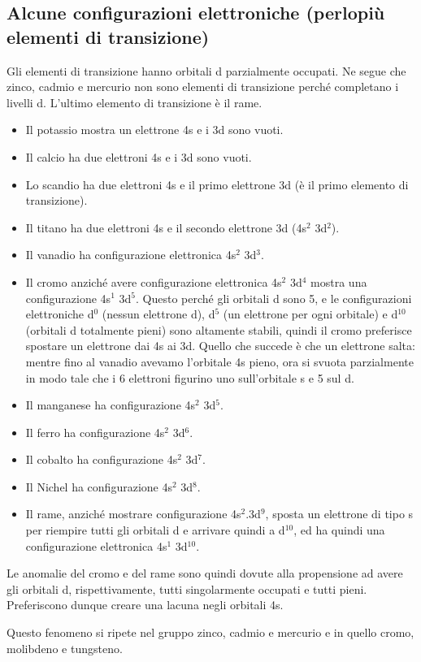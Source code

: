 \subsection{Alcune configurazioni elettroniche (perlopiù elementi di transizione)}
Gli elementi di transizione hanno orbitali d parzialmente occupati. Ne segue che zinco, cadmio e mercurio non sono elementi di transizione perché completano i livelli d. L'ultimo elemento di transizione è il rame.
\begin{itemize}
  \item Il potassio mostra un elettrone 4s e i 3d sono vuoti.
  \item Il calcio ha due elettroni 4s e i 3d sono vuoti.
  \item Lo scandio ha due elettroni 4s e il primo elettrone 3d (è il primo elemento di transizione).
  \item Il titano ha due elettroni 4s e il secondo elettrone 3d (4s$^2$ 3d$^2$).
  \item Il vanadio ha configurazione elettronica 4s$^2$ 3d$^3$.
  \item Il cromo anziché avere configurazione elettronica 4s$^2$ 3d$^4$ mostra una configurazione 4s$^1$ 3d$^5$. Questo perché gli orbitali d sono 5, e le configurazioni elettroniche d$^0$ (nessun elettrone d), d$^5$ (un elettrone per ogni orbitale) e d$^10$ (orbitali d totalmente pieni) sono altamente stabili, quindi il cromo preferisce spostare un elettrone dai 4s ai 3d. Quello che succede è che un elettrone salta: mentre fino al vanadio avevamo l'orbitale 4s pieno, ora si svuota parzialmente in modo tale che i 6 elettroni figurino uno sull'orbitale s e 5 sul d.
  \item Il manganese ha configurazione 4s$^2$ 3d$^5$.
  \item Il ferro ha configurazione 4s$^2$ 3d$^6$.
  \item Il cobalto ha configurazione 4s$^2$ 3d$^7$.
  \item Il Nichel ha configurazione 4s$^2$ 3d$^8$.
  \item Il rame, anziché mostrare configurazione 4s$^2$.3d$^9$, sposta un elettrone di tipo s per riempire tutti gli orbitali d e arrivare quindi a d$^10$, ed ha quindi una configurazione elettronica 4s$^1$ 3d$^10$.
\end{itemize}
Le anomalie del cromo e del rame sono quindi dovute alla propensione ad avere gli orbitali d, rispettivamente, tutti singolarmente occupati e tutti pieni. Preferiscono dunque creare una lacuna negli orbitali 4s.

Questo fenomeno si ripete nel gruppo zinco, cadmio e mercurio e in quello cromo, molibdeno e tungsteno.

